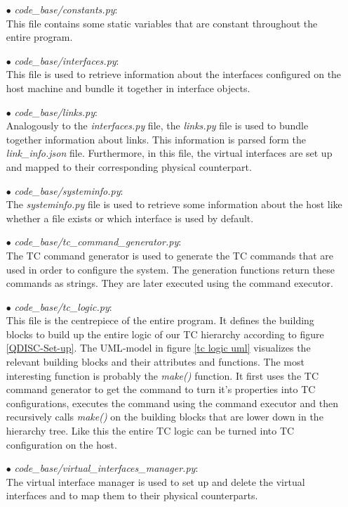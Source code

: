 \begin{enumerate}
\item[$\bullet$]\textit{code\_base/constants.py}:
\\
This file contains some static variables that are constant throughout the entire program. 

\item[$\bullet$]\textit{code\_base/interfaces.py}:
\\
This file is used to retrieve information about the interfaces configured on the host machine and bundle it together in interface objects.

\item[$\bullet$]\textit{code\_base/links.py}:
\\
Analogously to the \textit{interfaces.py} file, the \textit{links.py} file is used to bundle together information about links. This information is parsed form the \textit{link\_info.json} file. Furthermore, in this file, the virtual interfaces are set up and mapped to their corresponding physical counterpart.

\item[$\bullet$]\textit{code\_base/systeminfo.py}:
\\
The \textit{systeminfo.py} file is used to retrieve some information about the host like whether a file exists or which interface is used by default.

\item[$\bullet$]\textit{code\_base/tc\_command\_generator.py}:
\\
The \acs{TC} command generator is used to generate the \acs{TC} commands that are used in order to configure the system. The generation functions return these commands as strings. They are later executed using the command executor.

\item[$\bullet$]\textit{code\_base/tc\_logic.py}:
\\
This file is the centrepiece of the entire program. It defines the building blocks to build up the entire logic of our \acs{TC} hierarchy according to figure \ref{QDISC-Set-up}. The \ac{UML}-model in figure \ref{tc logic uml} visualizes the relevant building blocks and their attributes and functions. The most interesting function is probably the \textit{make()} function. It first uses the \acs{TC} command generator to get the command to turn it's properties into \acs{TC} configurations, executes the command using the command executor and then recursively calls \textit{make()} on the building blocks that are lower down in the hierarchy tree. Like this the entire \acs{TC} logic can be turned into \acs{TC} configuration on the host. 

\item[$\bullet$]\textit{code\_base/virtual\_interfaces\_manager.py}:
\\
The virtual interface manager is used to set up and delete the virtual interfaces and to map them to their physical counterparts.

\end{enumerate}

